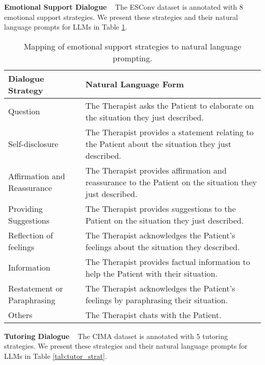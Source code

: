 \documentclass{article} %
\begin{document}
\noindent \textbf{Emotional Support Dialogue} ~ The ESConv dataset \citep{esconv} is annotated with 8 emotional support strategies. We present these strategies and their natural language prompts for LLMs in Table \ref{tab:esc_strat}. 

\begin{table}[h]
    \centering
    \begin{tabular}{l|p{9cm}}
        Dialogue Strategy & Natural Language Form \\
        \hline
        Question & The Therapist asks the Patient to elaborate on the situation they just described. \\
        Self-disclosure & The Therapist provides a statement relating to the Patient about the situation they just described. \\
        Affirmation and Reassurance & The Therapist provides affirmation and reassurance to the Patient on the situation they just described. \\
        Providing Suggestions & The Therapist provides suggestions to the Patient on the situation they just described. \\
        Reflection of feelings & The Therapist acknowledges the Patient’s feelings about the situation they described. \\
        Information & The Therapist provides factual information to help the Patient with their situation. \\
        Restatement or Paraphrasing & The Therapist acknowledges the Patient’s feelings by paraphrasing their situation. \\
        Others & The Therapist chats with the Patient. \\
    \end{tabular}
    \caption{Mapping of emotional support strategies to natural language prompting.}
    \label{tab:esc_strat}
\end{table}

\noindent \textbf{Tutoring Dialogue} ~ The CIMA dataset \citep{esconv} is annotated with 5 tutoring strategies. We present these strategies and their natural language prompts for LLMs in Table \ref{tab:tutor_strat}. 
\end{document}
